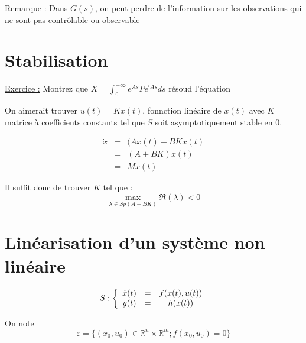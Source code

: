 
\underline{Remarque :} Dans $G(s)$, on peut perdre de l'information sur les observations qui ne sont pas contrôlable ou observable

\section{Stabilisation}


\underline{Exercice :} Montrez que $X=\int_0^{+\infty} e^{As}Pe^{{}^tAs} ds$ résoud l'équation

\bigskip
On aimerait trouver $u(t)=Kx(t)$, fonnction linéaire de $x(t)$ avec $K$ matrice à coefficients constants tel que $S$ soit asymptotiquement stable en 0.

\begin{eqnarray*}
\dot{x}&=&(Ax(t)+BKx(t)\\
	&=& (A+BK)x(t)\\
	&=& Mx(t)
\end{eqnarray*}

Il suffit donc de trouver $K$ tel que : \[\max_{\lambda\in Sp(A+BK)} \Re(\lambda)<0\]


\section{Linéarisation d'un système non linéaire}
\[S:\left\{ \begin{array}{c c c} \dot{x}(t)&=&f(x(t),u(t)) \\ y(t)&=&h(x(t)) \end{array} \right.\]


On note \[\varepsilon=\{(x_0,u_0)\in\mathbb{R}^n\times\mathbb{R}^m; f(x_0,u_0)=0\}\]

